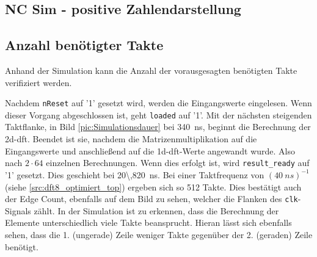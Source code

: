  \subsection{NC Sim - positive Zahlendarstellung}
 
 \subsection{Anzahl benötigter Takte}
 Anhand der Simulation kann die Anzahl der vorausgesagten benötigten Takte verifiziert werden. 
 
 Nachdem \texttt{nReset} auf '1' gesetzt wird, werden die Eingangswerte
 eingelesen. Wenn dieser Vorgang abgeschlossen ist, geht \texttt{loaded} auf '1'. Mit der nächsten steigenden Taktflanke, in Bild \ref{pic:Simulationsdauer} bei 
 \SI{340}{ns}, beginnt die Berechnung
 der \gls{2d-dft}. Beendet ist sie, nachdem die Matrizenmultiplikation auf die Eingangswerte und anschließend auf die \gls{1d-dft}-Werte angewandt wurde. Also nach $2 \cdot 64$
 einzelnen Berechnungen. Wenn dies erfolgt ist, wird \texttt{result\_ready} auf '1' gesetzt. Dies geschieht bei \SI{20\,820}{ns}. Bei einer Taktfrequenz von $(\SI{40}{ns})^{-1}$
 (siehe \ref{src:dft8_optimiert_top}) ergeben sich so 512 Takte. Dies bestätigt auch der Edge Count, ebenfalls auf dem Bild zu sehen, welcher die Flanken des \texttt{clk}-Signals 
 zählt. In der Simulation ist zu erkennen, dass die Berechnung der Elemente 
 unterschiedlich viele Takte beansprucht. Hieran lässt sich ebenfalls sehen, dass die 1. (ungerade) Zeile weniger Takte gegenüber der 2. (geraden) Zeile benötigt. 
 
 
